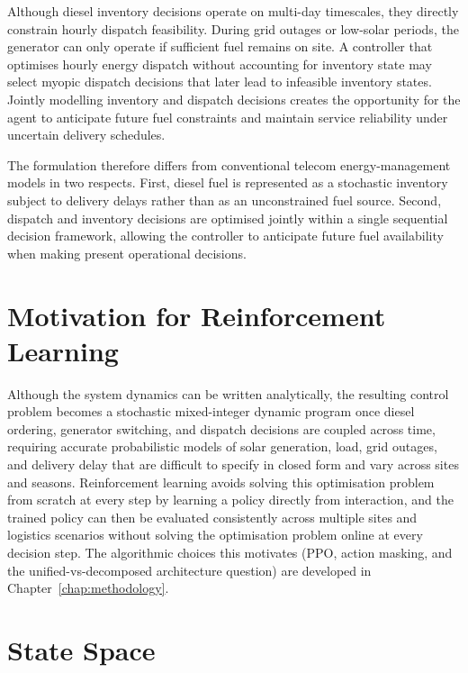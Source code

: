 Although diesel inventory decisions operate on multi-day timescales, they
directly constrain hourly dispatch feasibility. During grid outages or
low-solar periods, the generator can only operate if sufficient fuel remains
on site. A controller that optimises hourly energy dispatch without accounting
for inventory state may select myopic dispatch decisions that later lead to infeasible inventory states. Jointly modelling inventory and dispatch
decisions creates the opportunity for the agent to anticipate future fuel constraints and maintain
service reliability under uncertain delivery schedules.

The formulation therefore differs from conventional telecom energy-management
models in two respects. First, diesel fuel is represented as a stochastic
inventory subject to delivery delays rather than as an unconstrained fuel
source. Second, dispatch and inventory decisions are optimised jointly within
a single sequential decision framework, allowing the controller to anticipate
future fuel availability when making present operational decisions.

\section{Motivation for Reinforcement Learning}
\label{sec:rl_motivation}

Although the system dynamics can be written analytically, the resulting
control problem becomes a stochastic mixed-integer dynamic program once
diesel ordering, generator switching, and dispatch decisions are
coupled across time, requiring accurate probabilistic models of solar
generation, load, grid outages, and delivery delay that are difficult
to specify in closed form and vary across sites and seasons.
Reinforcement learning avoids solving this optimisation problem from
scratch at every step by learning a policy directly from interaction,
and the trained policy can then be evaluated consistently across multiple sites and logistics scenarios without solving the optimisation problem online at every decision step. The algorithmic choices this motivates (PPO, action
masking, and the unified-vs-decomposed architecture question) are
developed in Chapter~\ref{chap:methodology}.

\section{State Space}
\label{sec:state}


